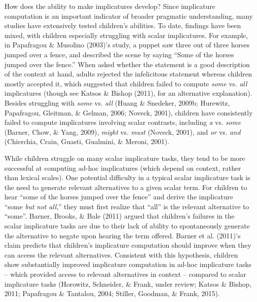 \documentclass[a4paper,man,apacite,floatsintext]{apa6}
\begin{document}
How does the ability to make implicatures develop? Since implicature
computation is an important indicator of broader pragmatic
understanding, many studies have extensively tested children's
abilities. To date, findings have been mixed, with children especially
struggling with scalar implicatures. For example, in Papafragou \&
Musolino (2003)'s study, a puppet saw three out of three horses jumped
over a fence, and described the scene by saying ``Some of the horses
jumped over the fence.'' When asked whether the statement is a good
description of the context at hand, adults rejected the infelicitous
statement whereas children mostly accepted it, which suggested that
children failed to compute \emph{some} vs. \emph{all} implicatures
(though see Katsos \& Bishop (2011), for an alternative explanation).
Besides struggling with \emph{some} vs. \emph{all} (Huang \& Snedeker,
2009b; Hurewitz, Papafragou, Gleitman, \& Gelman, 2006; Noveck, 2001),
children have consistently failed to compute implicatures involving
scalar contrasts, including \emph{a} vs. \emph{some} (Barner, Chow, \&
Yang, 2009), \emph{might} vs. \emph{must} (Noveck, 2001), and \emph{or}
vs. \emph{and} (Chierchia, Crain, Guasti, Gualmini, \& Meroni, 2001).

While children struggle on many scalar implicature tasks, they tend to
be more successful at computing ad-hoc implicatures (which depend on
context, rather than lexical scales). One potential difficulty in a
typical scalar implicature task is the need to generate relevant
alternatives to a given scalar term. For children to hear ``some of the
horses jumped over the fence'' and derive the implicature ``some
\emph{but not all},'' they must first realize that ``all'' is the
relevant alternative to ``some''. Barner, Brooks, \& Bale (2011) argued
that children's failures in the scalar implicature tasks are due to
their lack of ability to spontaneously generate the alternative to
negate upon hearing the term offered. Barner et al. (2011)'s claim
predicts that children's implicature computation should improve when
they can access the relevant alternatives. Consistent with this
hypothesis, children show substantially improved implicature computation
in ad-hoc implicature tasks -- which provided access to relevant
alternatives in context -- compared to scalar implicature tasks
(Horowitz, Schneider, \& Frank, under review; Katsos \& Bishop, 2011;
Papafragou \& Tantalou, 2004; Stiller, Goodman, \& Frank, 2015).
\end{document}
